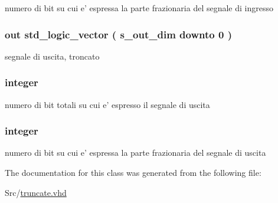 numero di bit su cui e' espressa la parte frazionaria del segnale di ingresso 

\hypertarget{classtruncate_a7c0b5e84820296cfa624ce710d19debd}{
\subsubsection[{s\+\_\+out}]{ {\bfseries \textcolor{vhdlchar}{out}\textcolor{vhdlchar}{ }} {\bfseries \textcolor{vhdlchar}{std\+\_\+logic\+\_\+vector}\textcolor{vhdlchar}{ }\textcolor{vhdlchar}{(}\textcolor{vhdlchar}{ }\textcolor{vhdlchar}{ }\textcolor{vhdlchar}{ }\textcolor{vhdlchar}{ }{\bfseries {\bf s\+\_\+out\+\_\+dim}} \textcolor{vhdlchar}{ }\textcolor{vhdlchar}{downto}\textcolor{vhdlchar}{ }\textcolor{vhdlchar}{ } \textcolor{vhdldigit}{0} \textcolor{vhdlchar}{ }\textcolor{vhdlchar}{)}\textcolor{vhdlchar}{ }} \hspace{0.3cm}{\ttfamily [Port]}}}\label{classtruncate_a7c0b5e84820296cfa624ce710d19debd}


segnale di uscita, troncato 

\hypertarget{classtruncate_a8b62f8bfecb0fab845995b8b051101bc}{
\subsubsection[{s\+\_\+out\+\_\+dim}]{ {\bfseries \textcolor{vhdlchar}{ }} {\bfseries \textcolor{vhdlchar}{integer}\textcolor{vhdlchar}{ }} \hspace{0.3cm}{\ttfamily [Generic]}}}\label{classtruncate_a8b62f8bfecb0fab845995b8b051101bc}


numero di bit totali su cui e' espresso il segnale di uscita 

\hypertarget{classtruncate_a4ca792ca981e2f9d82bf36d9c82c08af}{
\subsubsection[{s\+\_\+out\+\_\+int}]{ {\bfseries \textcolor{vhdlchar}{ }} {\bfseries \textcolor{vhdlchar}{integer}\textcolor{vhdlchar}{ }} \hspace{0.3cm}{\ttfamily [Generic]}}}\label{classtruncate_a4ca792ca981e2f9d82bf36d9c82c08af}


numero di bit su cui e' espressa la parte frazionaria del segnale di uscita 



The documentation for this class was generated from the following file\+:\begin{DoxyCompactItemize}
\item 
Src/\hyperlink{truncate_8vhd}{truncate.\+vhd}\end{DoxyCompactItemize}
